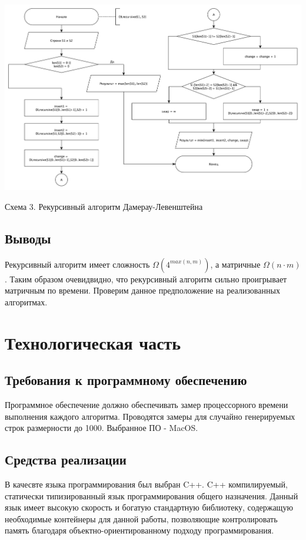 \documentclass[a4paper,12pt]{article}
\begin{document}
\begin{center}
    \includegraphics[scale=0.5]{DLrecursive}

    Схема 3. Рекурсивный алгоритм Дамерау-Левенштейна
\end{center}

\subsection{Выводы}

Рекурсивный алгоритм имеет сложность $\Omega (4^{max(n,m)})$, а матричные
$\Omega (n \cdot m)$. Таким образом очевидвидно, что рекурсивный алгоритм
сильно проигрывает матричным по времени. Проверим данное предположение
на реализованных алгоритмах.

\newpage
\section{Технологическая часть}

\subsection{Требования к программному обеспечению}

Программное обеспечение должно обеспечивать замер процессорного времени
выполнения каждого алгоритма. Проводятся замеры для случайно генерируемых
строк размерности до 1000. Выбранное ПО - MacOS.

\subsection{Средства реализации}

В качесвте языка программирования был выбран C++. C++ компилируемый,
статически типизированный язык программирования общего назначения.
Данный язык имеет высокую скорость и богатую стандартную библиотеку,
содержащую необходимые контейнеры для данной работы, позволяющие
контролировать память благодаря объектно-ориентированному подходу
программирования.
\end{document}
